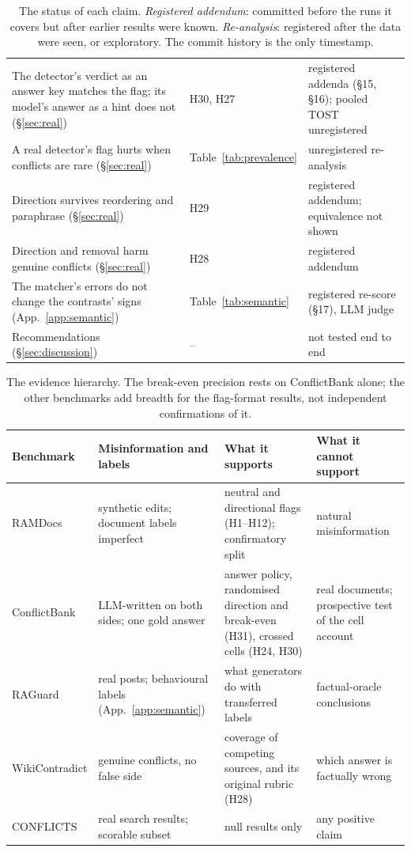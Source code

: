 \begin{table}[t]
\begin{tabular}{p{7.4cm}p{3.6cm}p{4.2cm}}
The detector's verdict as an answer key matches the flag; its model's answer as a hint does not (\S\ref{sec:real}) & H30, H27 & registered addenda (\S15, \S16); pooled TOST unregistered \\
A real detector's flag hurts when conflicts are rare (\S\ref{sec:real}) & Table~\ref{tab:prevalence} & unregistered re-analysis \\
Direction survives reordering and paraphrase (\S\ref{sec:real}) & H29 & registered addendum; equivalence not shown \\
Direction and removal harm genuine conflicts (\S\ref{sec:real}) & H28 & registered addendum \\
The matcher's errors do not change the contrasts' signs (App.~\ref{app:semantic}) & Table~\ref{tab:semantic} & registered re-score (\S17), LLM judge \\
Recommendations (\S\ref{sec:discussion}) & -- & not tested end to end \\
\bottomrule
\end{tabular}
\caption{The status of each claim. \emph{Registered addendum}: committed before the runs it covers but
after earlier results were known. \emph{Re-analysis}: registered after the data were seen, or exploratory. The commit
history is the only timestamp.}
\label{tab:claims}
\end{table}

\begin{table}[t]
\centering\footnotesize
\setlength{\tabcolsep}{4pt}
\begin{tabular}{p{2.3cm}p{3.6cm}p{4.4cm}p{4.6cm}}
\toprule
Benchmark & Misinformation and labels & What it supports & What it cannot support \\
\midrule
RAMDocs & synthetic edits; document labels imperfect & neutral and directional flags (H1--H12); confirmatory split & natural misinformation \\
ConflictBank & LLM-written on both sides; one gold answer & answer policy, randomised direction and break-even (H31), crossed cells (H24, H30) & real documents; prospective test of the cell account \\
RAGuard & real posts; behavioural labels (App.~\ref{app:semantic}) & what generators do with transferred labels & factual-oracle conclusions \\
WikiContradict & genuine conflicts, no false side & coverage of competing sources, and its original rubric (H28) & which answer is factually wrong \\
CONFLICTS & real search results; scorable subset & null results only & any positive claim \\
\bottomrule
\end{tabular}
\caption{The evidence hierarchy. The break-even precision rests on
ConflictBank alone; the other benchmarks add breadth for the flag-format results, not independent confirmations of it.}
\label{tab:evidence}
\end{table}

